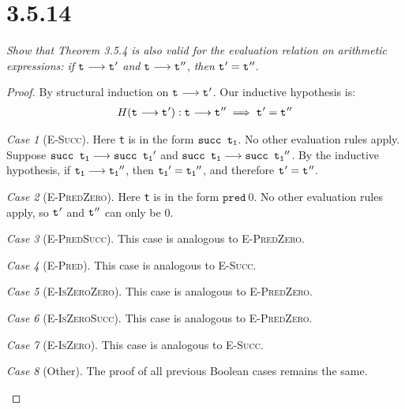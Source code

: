 \documentclass{article}
\newcommand{\term}[1]{\texttt{t\textsubscript{#1}}}
\newcommand{\ms}[1]{\texttt{#1}}
\theoremstyle{remark}
\newtheorem*{case}{Case}
\begin{document}
\section{3.5.14}

    \textit{Show that Theorem 3.5.4 is also valid for the evaluation relation}
    \textit{on arithmetic expressions: if} $\term{} \longrightarrow \term{}'$ \textit{and}
    $\term{} \longrightarrow \term{}''$, \textit{then} $\term{}' = \term{}''$.

    \begin{proof}
        By structural induction on $\term{} \longrightarrow \term{}'$. Our inductive hypothesis is:
        \begin{align*}
            H(\term{} \longrightarrow \term{}'): \term{} \longrightarrow \term{}'' \implies \term{}' = \term{}''
        \end{align*}

        \begin{case}[\textsc{E-Succ}]
            Here \term{} is in the form $\ms{succ \term{1}}$. No other evaluation rules apply.
            Suppose $\ms{succ \term{1}} \longrightarrow \ms{succ \term{1}}'$ and
            $\ms{succ \term{1}} \longrightarrow \ms{succ \term{1}}''$.
            By the inductive hypothesis, if $\term{1} \longrightarrow \term{1}''$,
            then $\term{1}' = \term{1}''$, and therefore $\term{}' = \term{}''$.
        \end{case}

        \begin{case}[\textsc{E-PredZero}]
            Here \term{} is in the form $\ms{pred}\ 0$. No other evaluation rules apply,
            so $\term{}'$ and $\term{}''$ can only be $0$.
        \end{case}

        \begin{case}[\textsc{E-PredSucc}]
            This case is analogous to \textsc{E-PredZero}.
        \end{case}

        \begin{case}[\textsc{E-Pred}]
            This case is analogous to \textsc{E-Succ}.
        \end{case}

        \begin{case}[\textsc{E-IsZeroZero}]
            This case is analogous to \textsc{E-PredZero}.
        \end{case}

        \begin{case}[\textsc{E-IsZeroSucc}]
            This case is analogous to \textsc{E-PredZero}.
        \end{case}

        \begin{case}[\textsc{E-IsZero}]
            This case is analogous to \textsc{E-Succ}.
        \end{case}

        \begin{case}[Other]
            The proof of all previous Boolean cases remains the same.
        \end{case}
    \end{proof}
\end{document}
